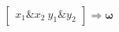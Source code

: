 \documentclass[preview]{standalone}
\begin{document}
\begin{align*}
\begin{bmatrix} x_1 \& x_2 \ y_1 \& y_2 \end{bmatrix} \Rightarrow \mathbf{\omega}
\end{align*}
\end{document}

